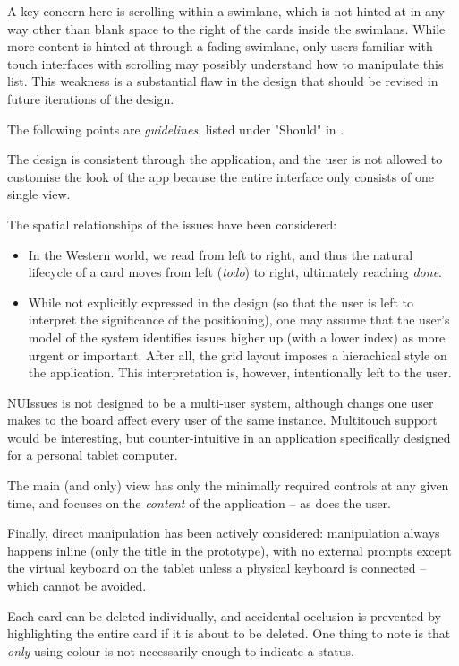A key concern here is scrolling within a swimlane, which is not hinted at in any way other than blank space to the right of the cards inside the swimlans. While more content is hinted at through a fading swimlane, only users familiar with touch interfaces with scrolling may possibly understand how to manipulate this list. This weakness is a substantial flaw in the design that should be revised in future iterations of the design.

The following points are \textit{guidelines}, listed under "Should" in \textcite[34]{wigdow-wixon:brave-nui-world:2011}.

The design is consistent through the application, and the user is not allowed to customise the look of the app because the entire interface only consists of one single view.

The spatial relationships of the issues have been considered:

\begin{itemize}
  \item In the Western world, we read from left to right, and thus the natural lifecycle of a card moves from left (\textit{todo}) to right, ultimately reaching \textit{done}.
  \item While not explicitly expressed in the design (so that the user is left to interpret the significance of the positioning), one may assume that the user's model of the system identifies issues higher up (with a lower index) as more urgent or important. After all, the grid layout imposes a hierachical style on the application. This interpretation is, however, intentionally left to the user. 
\end{itemize}

NUIssues is not designed to be a multi-user system, although changs one user makes to the board affect every user of the same instance. Multitouch support would be interesting, but counter-intuitive in an application specifically designed for a personal tablet computer.

The main (and only) view has only the minimally required controls at any given time, and focuses on the \textit{content} of the application -- as does the user.

Finally, direct manipulation has been actively considered: manipulation always happens inline (only the title in the prototype), with no external prompts except the virtual keyboard on the tablet unless a physical keyboard is connected -- which cannot be avoided.

Each card can be deleted individually, and accidental occlusion is prevented by highlighting the entire card if it is about to be deleted. One thing to note is that \textit{only} using colour is not necessarily enough to indicate a status.

